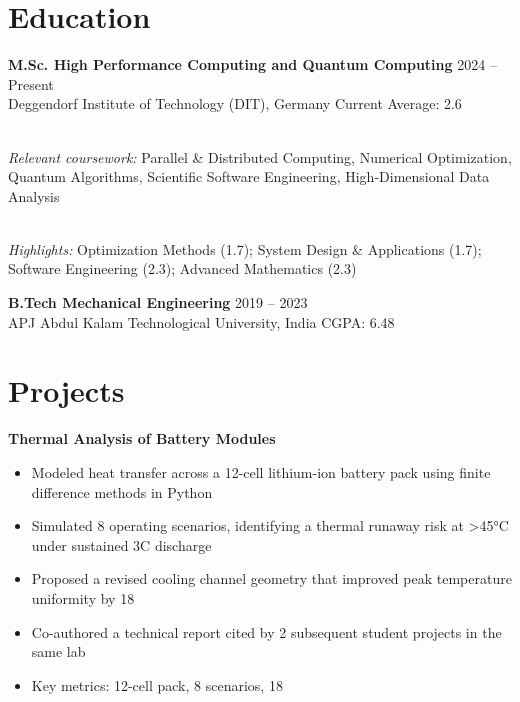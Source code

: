 \documentclass[11pt,a4paper]{article}
\begin{document}
\section{Education}

\textbf{ M.Sc. High Performance Computing and Quantum Computing } \hfill 2024 – Present\\
Deggendorf Institute of Technology (DIT), Germany \hfill Current Average: 2.6

\\\textit{Relevant coursework:} Parallel & Distributed Computing, Numerical Optimization, Quantum Algorithms, Scientific Software Engineering, High-Dimensional Data Analysis


\\\textit{Highlights:} Optimization Methods (1.7); System Design & Applications (1.7); Software Engineering (2.3); Advanced Mathematics (2.3)


\textbf{ B.Tech Mechanical Engineering } \hfill 2019 – 2023\\
APJ Abdul Kalam Technological University, India \hfill CGPA: 6.48




\section{Projects}

\textbf{ Thermal Analysis of Battery Modules }
\begin{itemize}[leftmargin=*,nosep,topsep=2pt]
    
    \item Modeled heat transfer across a 12-cell lithium-ion battery pack using finite difference methods in Python
    
    \item Simulated 8 operating scenarios, identifying a thermal runaway risk at >45°C under sustained 3C discharge
    
    \item Proposed a revised cooling channel geometry that improved peak temperature uniformity by 18%
    
    \item Co-authored a technical report cited by 2 subsequent student projects in the same lab
    
    \item Key metrics: 12-cell pack, 8 scenarios, 18%
    
\end{itemize}
\end{document}
